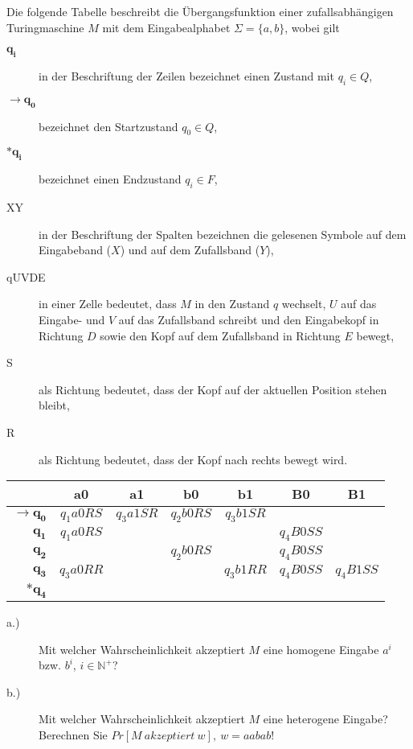 Die folgende Tabelle beschreibt die Übergangsfunktion einer zufallsabhängigen Turingmaschine $M$ mit dem Eingabealphabet $\Sigma = \{a, b\}$, wobei gilt
\begin{description}
	\item [$\boldsymbol{q_i}$] in der Beschriftung der Zeilen bezeichnet einen Zustand mit $q_i \in Q$,
	\item [$\boldsymbol{\rightarrow q_0}$] bezeichnet den Startzustand $q_0 \in Q$,
	\item [$*\boldsymbol{q_i}$] bezeichnet einen Endzustand $q_i \in F$,
	\item [XY] in der Beschriftung der Spalten bezeichnen die gelesenen Symbole auf dem Eingabeband ($X$) und auf dem Zufallsband ($Y$),
	\item [qUVDE] in einer Zelle bedeutet, dass $M$ in den Zustand $q$ wechselt, $U$ auf das Eingabe- und $V$ auf das Zufallsband schreibt und den Eingabekopf in Richtung $D$ sowie den Kopf auf dem Zufallsband in Richtung $E$ bewegt,
	\item [S] als Richtung bedeutet, dass der Kopf auf der aktuellen Position stehen bleibt,
	\item [R] als Richtung bedeutet, dass der Kopf nach rechts bewegt wird.
\end{description}

\bgroup
	\def\arraystretch{1.5}
	\begin{tabular}{r || c | c | c | c | c | c}
		& \textbf{a0} & \textbf{a1} & \textbf{b0} & \textbf{b1} & \textbf{B0} & \textbf{B1} \\
		\hline \hline
		$\boldsymbol{\rightarrow q_0}$ & $q_1a0RS$ & $q_3a1SR$ & $q_2b0RS$ & $q_3b1SR$ & & \\
		\hline
		$\boldsymbol{q_1}$ & $q_1a0RS$ & & & & $q_4B0SS$ & \\
		\hline
		$\boldsymbol{q_2}$ & & & $q_2b0RS$ & & $q_4B0SS$ & \\
		\hline
		$\boldsymbol{q_3}$ & $q_3a0RR$ & & & $q_3b1RR$ & $q_4B0SS$ & $q_4B1SS$ \\
		\hline
		$\boldsymbol{*q_4}$ & & & & & & \\
	\end{tabular}
\egroup

\begin{description}
	\item [a.)] Mit welcher Wahrscheinlichkeit akzeptiert $M$ eine homogene Eingabe $a^i$ bzw. $b^i$, $i \in \mathbb{N}^+$?
	\item [b.)] Mit welcher Wahrscheinlichkeit akzeptiert $M$ eine heterogene Eingabe? Berechnen Sie $Pr[M\ akzeptiert\ w],\ w = aabab$! 
\end{description}